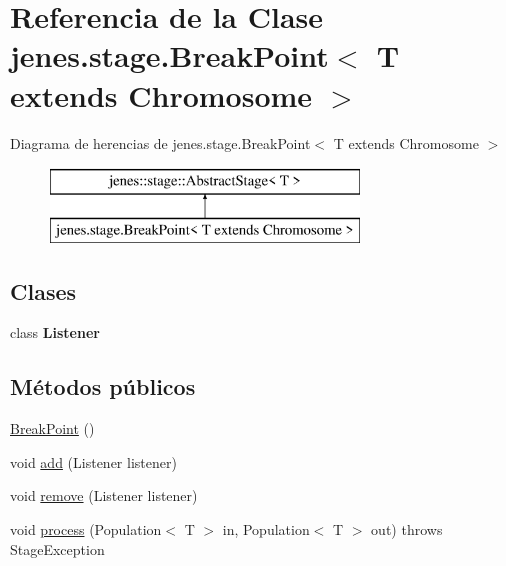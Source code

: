 \hypertarget{classjenes_1_1stage_1_1_break_point_3_01_t_01extends_01_chromosome_01_4}{\section{Referencia de la Clase jenes.\-stage.\-Break\-Point$<$ T extends Chromosome $>$}
\label{classjenes_1_1stage_1_1_break_point_3_01_t_01extends_01_chromosome_01_4}
}
Diagrama de herencias de jenes.\-stage.\-Break\-Point$<$ T extends Chromosome $>$\begin{figure}[H]
\begin{center}
\leavevmode
\includegraphics[height=2.000000cm]{classjenes_1_1stage_1_1_break_point_3_01_t_01extends_01_chromosome_01_4}
\end{center}
\end{figure}
\subsection*{Clases}
\begin{DoxyCompactItemize}
\item 
class {\bfseries Listener}
\end{DoxyCompactItemize}
\subsection*{Métodos públicos}
\begin{DoxyCompactItemize}
\item 
\hyperlink{classjenes_1_1stage_1_1_break_point_3_01_t_01extends_01_chromosome_01_4_a242b4e33e148a17a0f2d19e1963aa990}{Break\-Point} ()
\item 
void \hyperlink{classjenes_1_1stage_1_1_break_point_3_01_t_01extends_01_chromosome_01_4_aac70bbcb2e82710fe969bf1545c3a9f4}{add} (Listener listener)
\item 
void \hyperlink{classjenes_1_1stage_1_1_break_point_3_01_t_01extends_01_chromosome_01_4_a367d07e34b42c06b692ec35d0a8f8a40}{remove} (Listener listener)
\item 
void \hyperlink{classjenes_1_1stage_1_1_break_point_3_01_t_01extends_01_chromosome_01_4_a2fa0c075727e667e633bb9d3eb2b9e71}{process} (Population$<$ T $>$ in, Population$<$ T $>$ out)  throws Stage\-Exception 
\end{DoxyCompactItemize}


